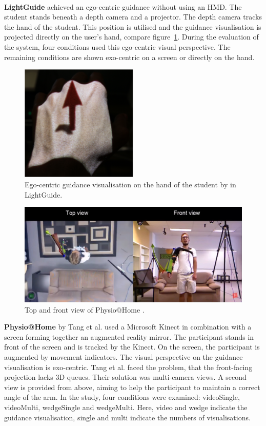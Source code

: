 \\ \textbf{LightGuide} \cite{Sodhi2012} achieved an ego-centric guidance without using an HMD. The student stands beneath a depth camera and a projector. The depth camera tracks the hand of the student. This position is utilised and the guidance visualisation is projected directly on the user's hand, compare figure~\ref{fig:lightguidepersp}. During the evaluation of the system, four conditions used this ego-centric visual perspective. The remaining conditions are shown exo-centric on a screen or directly on the hand.
\begin{figure}[h!]
	\centering
	\includegraphics[width=0.5\textwidth]{img/LightGuide_Persp.png}
	\caption{Ego-centric guidance visualisation on the hand of the student by \cite{Sodhi2012} in LightGuide.}
	\label{fig:lightguidepersp}
\end{figure}
\begin{figure}[h]
	\centering
	\includegraphics[width=1.0\textwidth]{img/physioPersp.png}
	\caption{Top and front view of Physio@Home \cite{Tang2015}.}
	\label{fig:physio_persp}
\end{figure}
\textbf{Physio@Home} by Tang et al. \cite{Tang2015} used a Microsoft Kinect in combination with a screen forming together an augmented reality mirror. The participant stands in front of the screen and is tracked by the Kinect. On the screen, the participant is augmented by movement indicators. The visual perspective on the guidance visualisation is exo-centric. Tang et al. faced the problem, that the front-facing projection lacks 3D queues. Their solution was multi-camera views. A second view is provided from above, aiming to help the participant to maintain a correct angle of the arm. In the study, four conditions were examined: videoSingle, videoMulti, wedgeSingle and wedgeMulti. Here, video and wedge indicate the guidance visualisation, single and multi indicate the numbers of visualisations.

